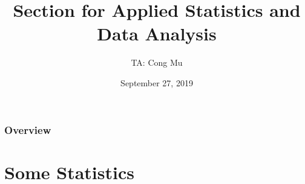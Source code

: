 \documentclass[serif,mathserif,professionalfont]{beamer}
\title[Section for EN.553.413/613]{Section for Applied Statistics and Data Analysis} %
\author{TA: Cong Mu} %
\institute[cmu2@jhu.edu] %
{
Office Hour: Wednesday 10:00AM - 12:00PM
\medskip
\textit{} %
}
\date{September 27, 2019} %
\begin{document}
\begin{frame}
\titlepage %
\end{frame}

\begin{frame}
\frametitle{Overview} %
\tableofcontents %
\end{frame}




\section{Some Statistics}


%	
%    	
	
	
\end{document}
